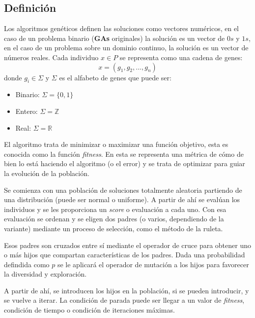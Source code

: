 \documentclass[12pt,letterpaper]{article}
\begin{document}
\subsection{Definición}
Los algoritmos genéticos definen las soluciones como vectores numéricos, en el caso de un problema binario (\textbf{GAs} originales) la solución es un vector de $0s$ y $1s$, en el caso de un problema sobre un dominio continuo, la solución es un vector de números reales.
Cada individuo $x \in P$ se representa como una cadena de genes:
\[ x = (g_1, g_2, ..., g_n) \]
donde $g_i \in \Sigma$ y $\Sigma$ es el alfabeto de genes que puede ser:
\begin{itemize}
    \item Binario: $\Sigma = \{0,1\}$
    \item Entero: $\Sigma = \mathbb{Z}$
    \item Real: $\Sigma = \mathbb{R}$
\end{itemize}
El algoritmo trata de minimizar o maximizar una función objetivo, esta es conocida como la función \textit{fitness}. En esta se representa una métrica de cómo de bien lo está haciendo el algoritmo (o el error) y se trata de optimizar para guiar la evolución de la población.

Se comienza con una población de soluciones totalmente aleatoria partiendo de una distribución (puede ser normal o uniforme). A partir de ahí se evalúan los individuos y se les proporciona un \textit{score} o evaluación a cada uno. Con esa evaluación se ordenan y se eligen dos padres (o varios, dependiendo de la variante) mediante un proceso de selección, como el método de la ruleta.

Esos padres son cruzados entre sí mediante el operador de cruce para obtener uno o más hijos que compartan características de los padres. Dada una probabilidad defindida como $p$ se le aplicará el operador de mutación a los hijos para favorecer la diversidad y exploración.

A partir de ahí, se introducen los hijos en la población, si se pueden introducir, y se vuelve a iterar. La condición de parada puede ser llegar a un valor de \textit{fitness}, condición de tiempo o condición de iteraciones máximas.
\end{document}
